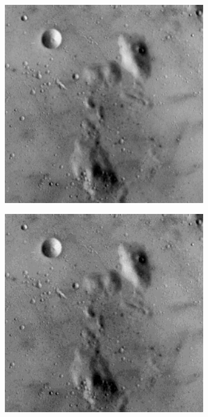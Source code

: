 \begin{figure}
\begin{subfigure}[b]{.23\textwidth}
  \caption{}
  \label{fig:test-images-moonsurface}
\end{subfigure}
\begin{subfigure}[b]{.23\textwidth}
  \centering
  \includegraphics[width=0.95\textwidth]{figures/test-images/truncate2/moonsurface}
  \caption{}
  \label{fig:test-images-moonsurface}
\end{subfigure}
\begin{subfigure}[b]{.23\textwidth}
  \centering
  \includegraphics[width=0.95\textwidth]{figures/test-images/truncate4/moonsurface}
  \caption{}
  \label{fig:test-images-moonsurface}
\end{subfigure}


\end{figure}
